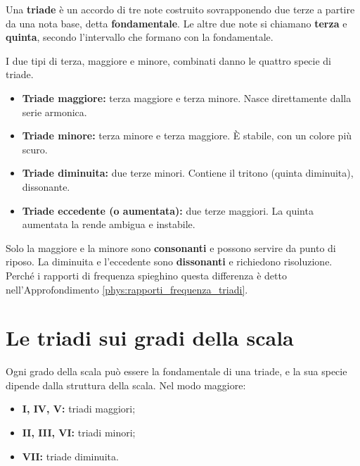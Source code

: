 \begin{definizione}[La triade]
	\label{def:triade}
	Una \textbf{triade} è un accordo di tre note costruito sovrapponendo due terze a partire da una nota base, detta \textbf{fondamentale}. Le altre due note si chiamano \textbf{terza} e \textbf{quinta}, secondo l'intervallo che formano con la fondamentale.
\end{definizione}

I due tipi di terza, maggiore e minore, combinati danno le quattro specie di triade.

\begin{definizione}
	\label{def:specie_triadi}
	\begin{itemize}
		\item \textbf{Triade maggiore:} terza maggiore e terza minore. Nasce direttamente dalla serie armonica.
		\item \textbf{Triade minore:} terza minore e terza maggiore. È stabile, con un colore più scuro.
		\item \textbf{Triade diminuita:} due terze minori. Contiene il tritono (quinta diminuita), dissonante.
		\item \textbf{Triade eccedente (o aumentata):} due terze maggiori. La quinta aumentata la rende ambigua e instabile.
	\end{itemize}
\end{definizione}

Solo la maggiore e la minore sono \textbf{consonanti} e possono servire da punto di riposo. La diminuita e l'eccedente sono \textbf{dissonanti} e richiedono risoluzione. Perché i rapporti di frequenza spieghino questa differenza è detto nell'Approfondimento \ref{phys:rapporti_frequenza_triadi}.

\begin{esempio}
	\label{ex:quattro_triadi}
\end{esempio}

\section{Le triadi sui gradi della scala}
\label{sec:triadi_sui_gradi}

Ogni grado della scala può essere la fondamentale di una triade, e la sua specie dipende dalla struttura della scala. Nel modo maggiore:

\begin{definizione}
	\label{def:triadi_diatoniche_maggiore}
	\begin{itemize}
		\item \textbf{I, IV, V:} triadi maggiori;
		\item \textbf{II, III, VI:} triadi minori;
		\item \textbf{VII:} triade diminuita.
	\end{itemize}
\end{definizione}

